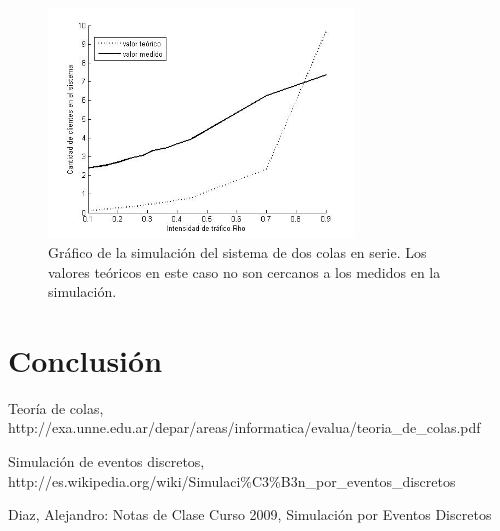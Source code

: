 \documentclass[10pt,journal,compsoc]{IEEEtran}
\begin{document}
\begin{figure}[t]%
\label{fig:puntodos}
\begin{center}
\centering
\includegraphics[width=3.2in]{plot_L}
\caption{Gr\'afico de la simulaci\'on del sistema de dos colas en serie. Los valores te\'oricos en este caso no son cercanos a los medidos en la simulaci\'on.}
\end{center}
\end{figure}


\section{Conclusi\'on} %


\begin{thebibliography}{1}

Teor\'ia de colas, http://exa.unne.edu.ar/depar/areas/informatica/evalua/teoria\_de\_colas.pdf

Simulaci\'on de eventos discretos, http://es.wikipedia.org/wiki/Simulaci\%C3\%B3n\_por\_eventos\_discretos

Diaz, Alejandro: Notas de Clase Curso 2009, Simulaci\'on por Eventos Discretos


\end{thebibliography}
\end{document}

